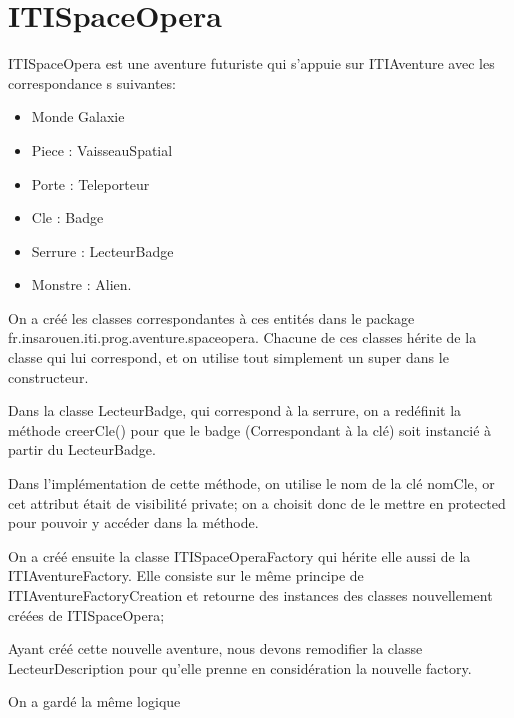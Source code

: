 \documentclass[12pt,a4paper]{report}
\begin{document}
\section{ITISpaceOpera}

ITISpaceOpera est une aventure futuriste qui s'appuie sur ITIAventure avec les correspondance s suivantes:
\begin{itemize}
\item Monde  Galaxie
\item Piece : VaisseauSpatial
\item Porte : Teleporteur
\item Cle : Badge
\item Serrure : LecteurBadge
\item Monstre : Alien.

\end{itemize}

On a créé les classes correspondantes à ces entités dans le package fr.insarouen.iti.prog.aventure.spaceopera.
Chacune de ces classes hérite de la classe qui lui correspond, et on utilise tout simplement un super dans le constructeur.

Dans la classe LecteurBadge, qui correspond à la serrure, on a redéfinit la méthode creerCle() pour que le badge (Correspondant à la clé) soit instancié à partir du LecteurBadge.

Dans l'implémentation de cette méthode, on utilise le nom de la clé nomCle, or cet attribut était de visibilité private; on a choisit donc de le mettre en protected pour pouvoir y accéder  dans la méthode.

On a créé ensuite la classe ITISpaceOperaFactory qui hérite elle aussi de la ITIAventureFactory. Elle consiste sur le même principe de ITIAventureFactoryCreation et retourne des instances des classes nouvellement créées de ITISpaceOpera;

Ayant créé cette nouvelle aventure, nous devons remodifier la classe LecteurDescription pour qu'elle prenne en considération la nouvelle factory.

On a gardé la même logique 
\end{document}
